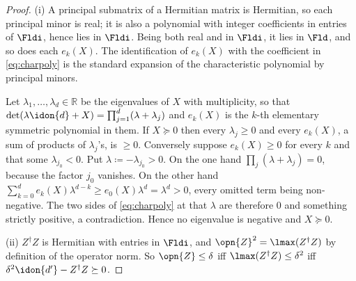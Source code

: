 \begin{proof}
(i) A principal submatrix of a Hermitian matrix is Hermitian, so each principal
minor is real; it is also a polynomial with integer coefficients in entries of
$\Fldi$, hence lies in $\Fldi$. Being both real and in $\Fldi$, it lies in
$\Fld$, and so does each $e_k(X)$. The identification of $e_k(X)$ with the
coefficient in \eqref{eq:charpoly} is the standard expansion of the
characteristic polynomial by principal minors.

Let $\lambda_1,\dots,\lambda_d\in\mathbb{R}$ be the eigenvalues of $X$ with
multiplicity, so that
$\det(\lambda\idon{d}+X)=\prod_{j=1}^{d}(\lambda+\lambda_j)$ and $e_k(X)$ is
the $k$-th elementary symmetric polynomial in them. If $X\succeq0$ then every
$\lambda_j\ge0$ and every $e_k(X)$, a sum of products of $\lambda_j$'s, is
$\ge0$. Conversely suppose $e_k(X)\ge0$ for every $k$ and that some
$\lambda_{j_0}<0$. Put $\lambda\coloneqq-\lambda_{j_0}>0$. On the one hand
$\prod_j(\lambda+\lambda_j)=0$, because the factor $j_0$ vanishes. On the other
hand
$\sum_{k=0}^{d}e_k(X)\lambda^{d-k}\ge e_0(X)\lambda^{d}=\lambda^{d}>0$, every
omitted term being non-negative. The two sides of \eqref{eq:charpoly} at that
$\lambda$ are therefore $0$ and something strictly positive, a
contradiction. Hence no eigenvalue is negative and $X\succeq0$.

(ii) $Z^{\dagger}Z$ is Hermitian with entries in $\Fldi$, and
$\opn{Z}^{2}=\lmax(Z^{\dagger}Z)$ by definition of the operator norm. So
$\opn{Z}\le\delta$ iff $\lmax(Z^{\dagger}Z)\le\delta^{2}$ iff
$\delta^{2}\idon{d'}-Z^{\dagger}Z\succeq0$.
\end{proof}
